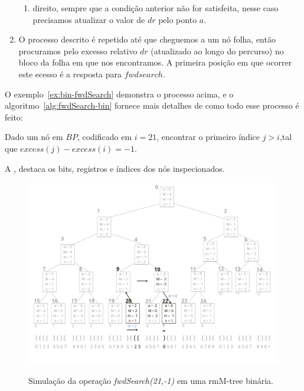 \begin{enumerate}
\begin{enumerate}
            \item direito, sempre que a condição anterior não for satisfeita, nesse caso precisamos atualizar o valor de $dr$ pelo ponto $a$.
        \end{enumerate}
         \item O processo descrito é repetido até que cheguemos a um nó folha, então procuramos pelo excesso relativo $dr$ (atualizado ao longo do percurso) no bloco da folha em que nos encontramos. A primeira posição em que ocorrer este ecesso é a resposta para $fwdsearch$.
    \end{enumerate}
    
    O exemplo~\ref*{ex:bin-fwdSearch} demonstra o processo acima, e o algoritmo~\ref*{alg:fwdSearch-bin} fornece mais detalhes de como todo esse processo é feito:
    \begin{example}\label{ex:bin-fwdSearch}

        Dado um nó em $BP$, codificado em $i=21$, encontrar o primeiro índice $j>i$,tal que $excess(j) - excess(i) = -1$.


        A , destaca os bits, registros e índices dos nós inspecionados.
        \begin{figure}[h!]
           \centering
             \caption[fwdSearch(21,-1).]{Simulação da operação \textit{fwdSearch(21,-1)} em uma rmM-tree binária.}
             \includegraphics[width=\columnwidth]{images/rmm-tree-bin-fwdsearch.png}
             \label{fig:bin-fwdSearch}
        \end{figure}


\end{example}
